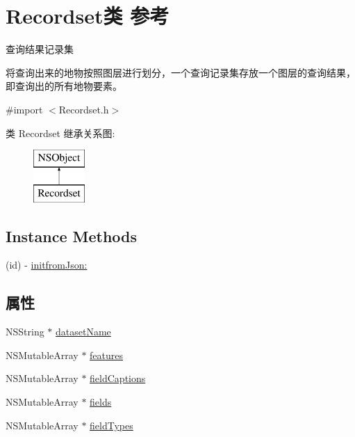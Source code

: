 \hypertarget{interface_recordset}{\section{Recordset类 参考}
\label{interface_recordset}
}


查询结果记录集 \par
 将查询出来的地物按照图层进行划分，一个查询记录集存放一个图层的查询结果， 即查询出的所有地物要素。  




{\ttfamily \#import $<$Recordset.\-h$>$}

类 Recordset 继承关系图\-:\begin{figure}[H]
\begin{center}
\leavevmode
\includegraphics[height=2.000000cm]{interface_recordset}
\end{center}
\end{figure}
\subsection*{Instance Methods}
\begin{DoxyCompactItemize}
\item 
(id) -\/ \hyperlink{interface_recordset_a36686a883d12b9134ad587da12cc4c6d}{initfrom\-Json\-:}
\end{DoxyCompactItemize}
\subsection*{属性}
\begin{DoxyCompactItemize}
\item 
N\-S\-String $\ast$ \hyperlink{interface_recordset_a17a7ab051b651a983c392452eceb0b28}{dataset\-Name}
\item 
N\-S\-Mutable\-Array $\ast$ \hyperlink{interface_recordset_ae6f0e40fdc04c4e63a62e8be7480625e}{features}
\item 
N\-S\-Mutable\-Array $\ast$ \hyperlink{interface_recordset_aa6c80a7cd4d52f37f5e840fa7ca85210}{field\-Captions}
\item 
N\-S\-Mutable\-Array $\ast$ \hyperlink{interface_recordset_ae20147a35c4cb7ef4601143e905472c8}{fields}
\item 
N\-S\-Mutable\-Array $\ast$ \hyperlink{interface_recordset_a08619b9dcb3f4bd54d8fb3c0a1059d85}{field\-Types}
\end{DoxyCompactItemize}


